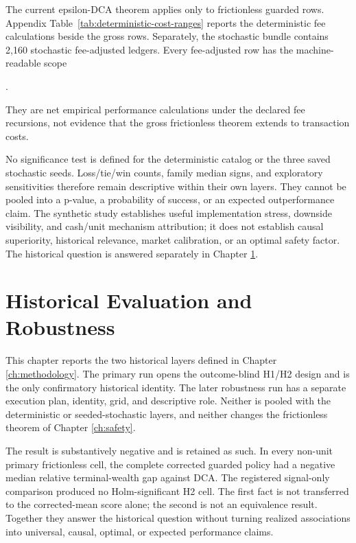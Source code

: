 \documentclass[12pt,a4paper,oneside]{report}
\begin{document}
The current epsilon-DCA theorem applies only to frictionless guarded rows.
Appendix Table~\ref{tab:deterministic-cost-ranges} reports the deterministic fee
calculations beside the gross rows. Separately, the stochastic bundle contains
2,160 stochastic fee-adjusted ledgers. Every fee-adjusted row has the
machine-readable scope
\begin{center}
  .
\end{center}
They are net empirical performance calculations under the declared fee
recursions, not evidence that the gross frictionless theorem extends to
transaction costs.

No significance test is defined for the deterministic catalog or the three
saved stochastic seeds. Loss/tie/win counts, family median signs, and
exploratory sensitivities therefore remain descriptive within their own
layers. They cannot be pooled into a p-value, a probability of success, or an
expected outperformance claim. The synthetic study establishes useful
implementation stress, downside visibility, and cash/unit mechanism
attribution; it does not establish causal superiority, historical relevance,
market calibration, or an optimal safety factor. The historical question is
answered separately in Chapter \ref{ch:historical-results}.

\chapter{Historical Evaluation and Robustness}
\label{ch:historical-results}

This chapter reports the two historical layers defined in Chapter
\ref{ch:methodology}. The primary run opens the outcome-blind H1/H2 design and
is the only confirmatory historical identity. The later robustness run has a
separate execution plan, identity, grid, and descriptive role. Neither is
pooled with the deterministic or seeded-stochastic layers, and neither changes
the frictionless theorem of Chapter \ref{ch:safety}.

The result is substantively negative and is retained as such. In every
non-unit primary frictionless cell, the complete corrected guarded policy had
a negative median relative terminal-wealth gap against DCA. The registered
signal-only comparison produced no Holm-significant H2 cell. The first fact is
not transferred to the corrected-mean score alone; the second is not an
equivalence result. Together they answer the historical question without
turning realized associations into universal, causal, optimal, or expected
performance claims.
\end{document}
